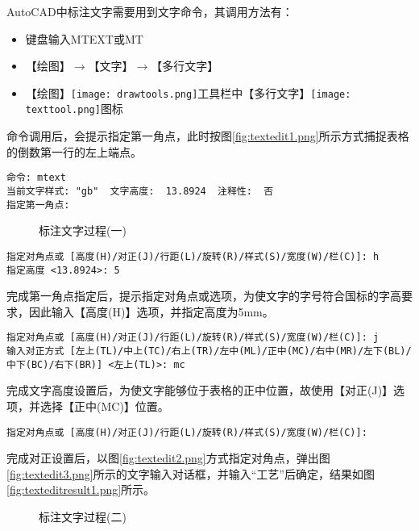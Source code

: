 \begin{procedure}
AutoCAD中标注文字需要用到文字命令，其调用方法有：
\begin{itemize}
\item 键盘输入MTEXT或MT
\item 【绘图】$\rightarrow$【文字】$\rightarrow$【多行文字】
\item 【绘图】\texttt{[image: drawtools.png]}工具栏中【多行文字】\texttt{[image: texttool.png]}图标
\end{itemize}

命令调用后，会提示指定第一角点，此时按图\ref{fig:textedit1.png}所示方式捕捉表格的倒数第一行的左上端点。
\begin{lstlisting}
命令: mtext
当前文字样式: "gb"  文字高度:  13.8924  注释性:  否
指定第一角点:
\end{lstlisting}
\begin{figure}[htbp]
\centering
{}\hspace{20pt}
\caption{标注文字过程(一)}
\end{figure}
\begin{lstlisting}
指定对角点或 [高度(H)/对正(J)/行距(L)/旋转(R)/样式(S)/宽度(W)/栏(C)]: h
指定高度 <13.8924>: 5
\end{lstlisting}
完成第一角点指定后，提示指定对角点或选项，为使文字的字号符合国标的字高要求，因此输入【高度(H)】选项，并指定高度为5mm。
\begin{lstlisting}
指定对角点或 [高度(H)/对正(J)/行距(L)/旋转(R)/样式(S)/宽度(W)/栏(C)]: j
输入对正方式 [左上(TL)/中上(TC)/右上(TR)/左中(ML)/正中(MC)/右中(MR)/左下(BL)/中下(BC)/右下(BR)] <左上(TL)>: mc
\end{lstlisting}
完成文字高度设置后，为使文字能够位于表格的正中位置，故使用【对正(J)】选项，并选择【正中(MC)】位置。
\begin{lstlisting}
指定对角点或 [高度(H)/对正(J)/行距(L)/旋转(R)/样式(S)/宽度(W)/栏(C)]:
\end{lstlisting}
完成对正设置后，以图\ref{fig:textedit2.png}方式指定对角点，弹出图\ref{fig:textedit3.png}所示的文字输入对话框，并输入“工艺”后确定，结果如图\ref{fig:texteditresult1.png}所示。
\begin{figure}[htbp]
\centering
{}\hspace{20pt}
\caption{标注文字过程(二)}
\end{figure}


\end{procedure}
